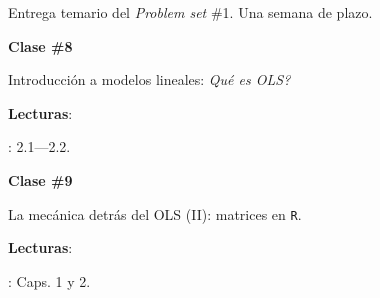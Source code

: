 \documentclass[letterpaper]{article}
\renewenvironment{itemize}{
  \begin{list}{}{
    \setlength{\leftmargin}{1.5em}
  }
}{
  \end{list}
}
\begin{document}
\begin{enumerate}
\item[{\color{red}\Pointinghand}] Entrega temario del \emph{Problem set} \#1. Una semana de plazo.


	\item {}


			\begin{itemize} 
				\item[$\bullet$] {\bf Clase \#8}
					\begin{itemize} 
						\item[$\circ$] Introducci\'on a modelos lineales: \emph{Qu\'e es OLS?}
						\item[$\circ$] {\bf Lecturas}: 
							\begin{itemize}
								\item[$\diamond$] \textcite{Wooldridge2010}: 2.1---2.2.
							\end{itemize}
					\end{itemize}
			\end{itemize}




			\begin{itemize} 
				\item[$\bullet$] {\bf Clase \#9}
					\begin{itemize} 
						\item[$\circ$] La mec\'anica detr\'as del OLS (II): matrices en \texttt{R}.
            \item[$\circ$] {\bf Lecturas}: 
            \begin{itemize}
              \item[$\diamond$] \textcite{Namboodiri1984}: Caps. 1 y 2.
            \end{itemize}
					\end{itemize}
			\end{itemize}




\end{enumerate}
\end{document}
